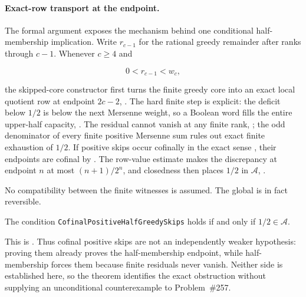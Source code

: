 \documentclass[11pt]{article}
\newcommand{\wgt}[1]{w_{#1}}
\newcommand{\Ach}{\mathcal A}
\begin{document}
\paragraph{Exact-row transport at the endpoint.}
The formal argument exposes the mechanism behind one conditional
half-membership implication.  Write $r_{c-1}$ for the rational greedy
remainder after ranks through $c-1$.  Whenever $c\ge4$ and

\[
  0<r_{c-1}<\wgt c,
\]

the skipped-core constructor first turns the finite greedy core into an exact
local quotient row at endpoint $2c-2$,
.
The hard finite step is explicit: the deficit below $1/2$ is below the next
Mersenne weight, so a Boolean word fills the entire upper-half capacity,
.
The residual cannot vanish at any finite rank,
;
the odd denominator of every finite positive Mersenne sum rules out exact
finite exhaustion of $1/2$.
If positive skips occur cofinally in the exact sense
,
their endpoints are cofinal by
.
The row-value estimate makes the discrepancy at endpoint $n$ at most
$(n+1)/2^n$, and closedness then places $1/2$ in $\Ach$,
.

No compatibility between the finite witnesses is assumed.  The global
is in fact reversible.

\begin{theorem}
\label{res:positiveskipexact}
The condition \texttt{CofinalPositiveHalfGreedySkips} holds if and only if
$1/2\in\Ach$.
\end{theorem}

\noindent This is
.
Thus cofinal positive skips are not an independently weaker hypothesis:
proving them already proves the half-membership endpoint, while
half-membership forces them because finite residuals never vanish.  Neither
side is established here, so the theorem identifies the exact obstruction
without supplying an unconditional counterexample to Problem~\#257.
\end{document}
